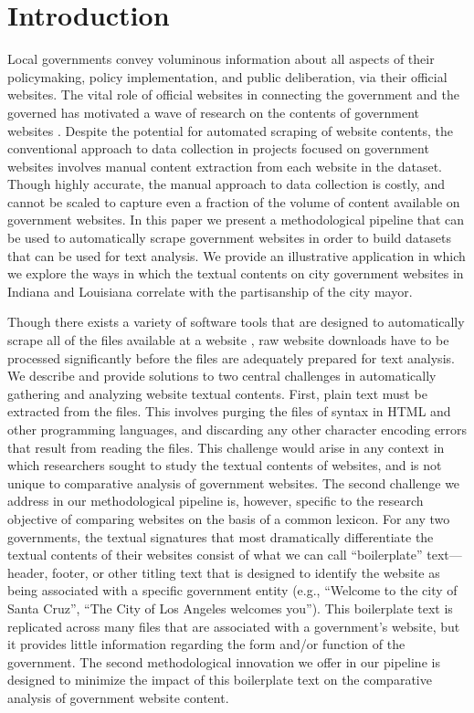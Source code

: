 \documentclass[11pt]{article}
\begin{document}
\thispagestyle{empty}
\section{Introduction}

Local governments convey voluminous information about all aspects of their policymaking, policy implementation, and public deliberation, via their official websites. The vital role of official websites in connecting the government and the governed has motivated a wave of research on the contents of government websites \citep[e.g., ][]{grimmelikhuijsen2010transparency,wang2005evaluating,osman2014cobra}. Despite the potential for automated scraping of website contents, the conventional approach to data collection in projects focused on government websites involves manual content extraction from each website in the dataset. Though highly accurate, the manual approach to data collection is costly, and cannot be scaled to capture even a fraction of the volume of content available on government websites. In this paper we present a methodological pipeline that can be used to automatically scrape government websites in order to build datasets that can be used for text analysis. We provide an illustrative application in which we explore the ways in which the textual contents on city government websites in Indiana and Louisiana correlate with the partisanship of the city mayor.

Though there exists a variety of software tools that are designed to automatically scrape all of the files available at a website \citep{glez2013web}, raw website downloads have to be processed significantly before the files are adequately prepared for text analysis. We describe and provide solutions to two central challenges in automatically gathering and analyzing website textual contents. First, plain text must be extracted from the files. This involves purging the files of syntax in HTML and other programming languages, and discarding any other character encoding errors that result from reading the files. This challenge would arise in any context in which researchers sought to study the textual contents of websites, and is not unique to comparative analysis of government websites. The second challenge we address in our methodological pipeline is, however, specific to the research objective of comparing websites on the basis of a common lexicon. For any two governments, the textual signatures that most dramatically differentiate the textual contents of their websites consist of what we can call ``boilerplate'' text---header, footer, or other titling text that is designed to identify the website as being associated with a specific government entity (e.g., ``Welcome to the city of Santa Cruz'', ``The City of Los Angeles welcomes you''). This boilerplate text is replicated across many files that are associated with a government's website, but it provides little information regarding the form and/or function of the government. The second methodological innovation we offer in our pipeline is designed to minimize the impact of this boilerplate text on the comparative analysis of government website content. 
\end{document}
